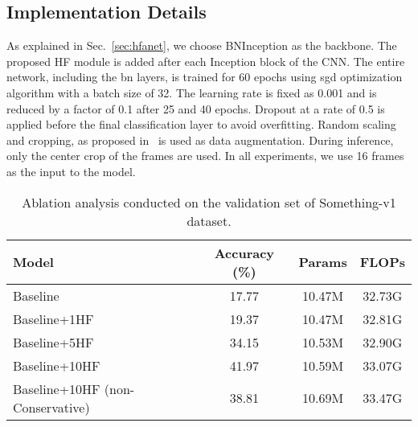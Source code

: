 \documentclass[journal,onecolumn]{IEEEtran}
\begin{document}
\subsection{Implementation Details}

As explained in Sec.~\ref{sec:hfanet}, we choose BNInception as the backbone. The proposed HF module is added after each Inception block of the CNN. The entire network, including the \ac{bn} layers, is trained for 60 epochs using \ac{sgd} optimization algorithm with a batch size of 32. The learning rate is fixed as 0.001 and is reduced by a factor of 0.1 after 25 and 40 epochs. Dropout at a rate of 0.5 is applied before the final classification layer to avoid overfitting. Random scaling and cropping, as proposed in~\cite{tsn} is used as data augmentation. During inference, only the center crop of the frames are used. In all experiments, we use 16 frames as the input to the model. 



\begin{table}[t]
	\centering 
	\begin{tabular}{|l|c|c|c|}
		\hline
		\textbf{Model} & \textbf{Accuracy (\%)} & \textbf{Params} & \textbf{FLOPs}\\   \hline
		Baseline & 17.77 & 10.47M & 32.73G\\ \hline
		Baseline+1HF & 19.37 & 10.47M & 32.81G \\ \hline
		Baseline+5HF & 34.15 & 10.53M & 32.90G \\ \hline
		Baseline+10HF & 41.97 & 10.59M & 33.07G \\ \hline
		Baseline+10HF (non-Conservative) & 38.81 & 10.69M & 33.47G\\ \hline
	\end{tabular}
	\caption{Ablation analysis conducted on the validation set of Something-v1 dataset.
    }
	\label{tab:ablation}
\end{table}
\end{document}
